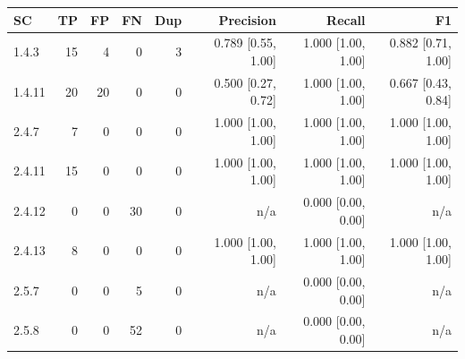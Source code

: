 \begin{tabular}{lrrrrrrr}
\hline
SC & TP & FP & FN & Dup & Precision & Recall & F1 \\
\hline
1.4.3 & 15 & 4 & 0 & 3 & 0.789 [0.55, 1.00] & 1.000 [1.00, 1.00] & 0.882 [0.71, 1.00] \\
1.4.11 & 20 & 20 & 0 & 0 & 0.500 [0.27, 0.72] & 1.000 [1.00, 1.00] & 0.667 [0.43, 0.84] \\
2.4.7 & 7 & 0 & 0 & 0 & 1.000 [1.00, 1.00] & 1.000 [1.00, 1.00] & 1.000 [1.00, 1.00] \\
2.4.11 & 15 & 0 & 0 & 0 & 1.000 [1.00, 1.00] & 1.000 [1.00, 1.00] & 1.000 [1.00, 1.00] \\
2.4.12 & 0 & 0 & 30 & 0 & n/a & 0.000 [0.00, 0.00] & n/a \\
2.4.13 & 8 & 0 & 0 & 0 & 1.000 [1.00, 1.00] & 1.000 [1.00, 1.00] & 1.000 [1.00, 1.00] \\
2.5.7 & 0 & 0 & 5 & 0 & n/a & 0.000 [0.00, 0.00] & n/a \\
2.5.8 & 0 & 0 & 52 & 0 & n/a & 0.000 [0.00, 0.00] & n/a \\
\hline
\end{tabular}


